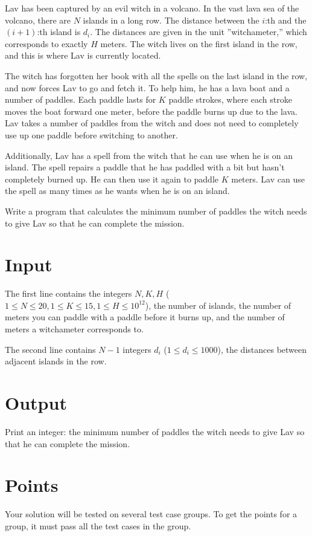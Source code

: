 
Lav has been captured by an evil witch in a volcano. In the vast lava sea of the volcano, there are $N$ islands in a long row.
The distance between the $i$:th and the $(i+1)$:th island is $d_i$. The distances are given in the unit
”witchameter,” which corresponds to exactly $H$ meters. The witch lives on the first island in the row,
and this is where Lav is currently located.

The witch has forgotten her book with all the spells on the last island in the row, and now forces Lav
to go and fetch it. To help him, he has a lava boat and a number of paddles.
Each paddle lasts for $K$ paddle strokes, where each stroke moves the boat forward one meter, before
the paddle burns up due to the lava.
Lav takes a number of paddles from the witch and does not need to completely use up one paddle before switching to another.

Additionally, Lav has a spell from the witch that he can use when he is on an island. The spell repairs
a paddle that he has paddled with a bit but hasn't completely burned up.
He can then use it again to paddle $K$ meters. Lav can use the spell as many times as he wants when he is on an island.

Write a program that calculates the minimum number of paddles the witch needs to give Lav so that he can complete the mission.


\section*{Input}
The first line contains the integers $N, K, H$ ($1 \leq N \leq 20, 1 \leq K \leq 15, 1 \leq H \leq 10^{12}$),
the number of islands, the number of meters you can paddle with a paddle before it burns up, and the number of meters a witchameter corresponds to.

The second line contains $N-1$ integers $d_i$ ($1 \leq d_i \leq 1000$), the distances between adjacent islands in the row.

\section*{Output}
Print an integer: the minimum number of paddles the witch needs to give Lav so that he can complete the mission.

\section*{Points}
Your solution will be tested on several test case groups.
To get the points for a group, it must pass all the test cases in the group.

